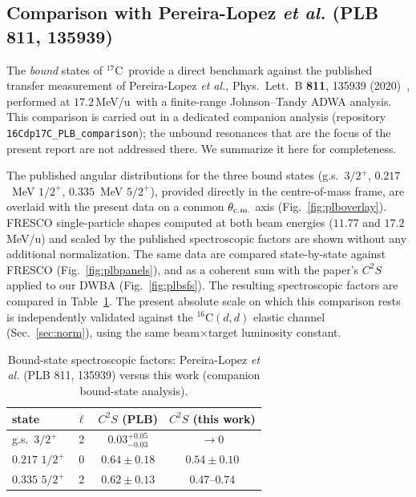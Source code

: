 \documentclass[11pt,a4paper]{article}
\newcommand{\Cs}{$^{16}$C}
\newcommand{\Cse}{$^{17}$C}
\newcommand{\mevu}{\,MeV/u}
\begin{document}
\subsection{Comparison with Pereira-Lopez \textit{et al.} (PLB 811, 135939)}
\label{sec:compare-plb}

The \emph{bound} states of \Cse\ provide a direct benchmark against the
published transfer measurement of Pereira-Lopez \textit{et al.}, Phys.\ Lett.\
B \textbf{811}, 135939 (2020)~\cite{PereiraLopez2020}, performed at
$17.2$\mevu\ with a finite-range Johnson--Tandy ADWA analysis. This comparison
is carried out in a dedicated companion analysis (repository
\texttt{16Cdp17C\_PLB\_comparison}); the unbound resonances that are the focus
of the present report are not addressed there. We summarize it here for
completeness.

The published angular distributions for the three bound states
(g.s.\ $3/2^+$, $0.217$~MeV $1/2^+$, $0.335$~MeV $5/2^+$), provided directly in
the centre-of-mass frame, are overlaid with the present data on a common
$\theta_{\rm c.m.}$ axis (Fig.~\ref{fig:plboverlay}). FRESCO single-particle
shapes computed at both beam energies ($11.77$ and $17.2$\mevu) and scaled by
the published spectroscopic factors are shown without any additional
normalization. The same data are compared state-by-state against FRESCO
(Fig.~\ref{fig:plbpanels}), and as a coherent sum with the paper's $C^2S$
applied to our DWBA (Fig.~\ref{fig:plbsfs}). The resulting spectroscopic factors
are compared in Table~\ref{tab:plbsf}. The present absolute scale on which this
comparison rests is independently validated against the \Cs$(d,d)$ elastic
channel (Sec.~\ref{sec:norm}), using the same beam$\times$target luminosity
constant.

\begin{table}[h]
  \centering
  \caption{Bound-state spectroscopic factors: Pereira-Lopez \textit{et al.}
  (PLB 811, 135939) versus this work (companion bound-state analysis).}
  \label{tab:plbsf}
  \begin{tabular}{lccc}
    \toprule
    state & $\ell$ & $C^2S$ (PLB) & $C^2S$ (this work) \\
    \midrule
    g.s.\ $3/2^+$   & 2 & $0.03^{+0.05}_{-0.03}$ & $\rightarrow 0$ \\
    $0.217$ $1/2^+$ & 0 & $0.64\pm0.18$          & $\mathbf{0.54\pm0.10}$ \\
    $0.335$ $5/2^+$ & 2 & $0.62\pm0.13$          & $0.47$--$0.74$ \\
    \bottomrule
  \end{tabular}
\end{table}
\end{document}
